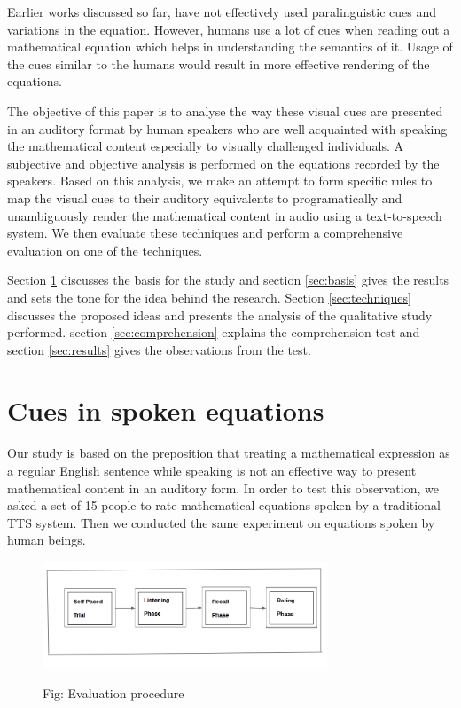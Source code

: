 \documentclass{article}
\begin{document}
Earlier works discussed so far, have not effectively  used paralinguistic cues and variations in the equation. However, humans use a lot of cues when reading out a mathematical equation which helps in understanding the semantics of it. Usage of the cues similar to the humans would result in more effective rendering of the equations.   

The objective of this paper is to analyse the way these visual cues are presented in an auditory format by human speakers who are well acquainted with speaking the mathematical content especially to visually challenged individuals. A subjective and objective analysis is performed on the equations recorded by the speakers. Based on this analysis, we make an attempt to form specific rules to map the visual cues to their auditory equivalents to programatically and unambiguously render the mathematical content in audio using a text-to-speech system. We then evaluate these techniques and perform a comprehensive evaluation on one of the techniques.

Section \ref{sec:cues} discusses the basis for the study and section \ref{sec:basis} gives the results and sets the tone for the idea behind the research. Section \ref{sec:techniques} discusses the proposed ideas and presents the analysis of the qualitative study performed. section \ref{sec:comprehension} explains the comprehension test and section \ref{sec:results} gives the observations from the test.

\section{Cues in spoken equations}
\label{sec:cues}

Our study is based on the preposition that treating a mathematical expression as a regular English sentence while speaking is not an effective way to present mathematical content in an auditory form. In order to test this observation, we asked a set of 15 people to rate mathematical equations spoken by a traditional TTS system.  Then we conducted the same experiment on equations spoken by human beings. 


\begin{figure}[h]
\label{fig:eval}

\begin{minipage}[b]{1.0\linewidth}
  \centering
  
  \centerline{\includegraphics[width=8.5cm]{eval}}
 
  \centerline{Fig: Evaluation procedure}\medskip
\end{minipage}
\end{figure}
\end{document}
